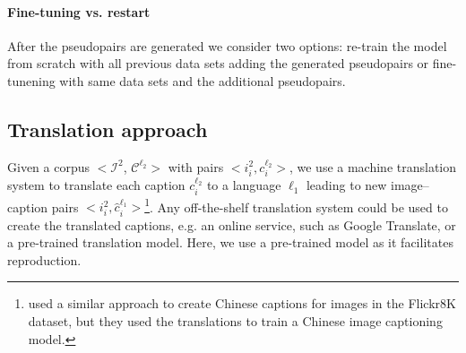\paragraph{Fine-tuning vs. restart}
After the pseudopairs are generated we consider two 
options: re-train the model from scratch with all previous 
data sets adding the generated pseudopairs or fine-tunening with
same data sets and the additional pseudopairs.


\subsection{Translation approach}\label{sec:method:mt}
Given a corpus  
$<\mathcal{I}^2$, $\mathcal{C}^{\ell_2}>$ with pairs 
$<i^2_i, c^{\ell_2}_i>$, we use a machine 
translation system 
to translate each caption $c^{\ell_2}_i$ to a language $\ell_1$ leading to new image--caption pairs 
$<i^2_i, \hat{c}^{\ell_1}_i>$\footnote{\cite{li2016adding} used a similar approach to create Chinese captions for images in the Flickr8K dataset, but they used the translations to train a Chinese image captioning model.}. 
Any off-the-shelf translation system could be used to create the translated captions, e.g. an online service, such as Google Translate, or a pre-trained translation model. Here, we use a pre-trained model as it facilitates reproduction. 



